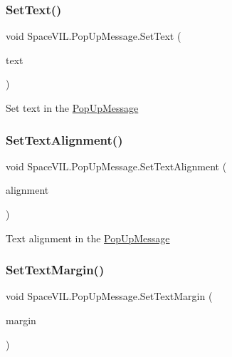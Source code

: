 \subsubsection{\texorpdfstring{Set\+Text()}{SetText()}}
{\footnotesize\ttfamily void Space\+V\+I\+L.\+Pop\+Up\+Message.\+Set\+Text (\begin{DoxyParamCaption}\item[{String}]{text }\end{DoxyParamCaption})}



Set text in the \mbox{\hyperlink{class_space_v_i_l_1_1_pop_up_message}{Pop\+Up\+Message}} 

\mbox{\label{class_space_v_i_l_1_1_pop_up_message_af4bf4824354cfdbe240c1fc613bc796e}} 
\subsubsection{\texorpdfstring{Set\+Text\+Alignment()}{SetTextAlignment()}}
{\footnotesize\ttfamily void Space\+V\+I\+L.\+Pop\+Up\+Message.\+Set\+Text\+Alignment (\begin{DoxyParamCaption}\item[{Item\+Alignment}]{alignment }\end{DoxyParamCaption})}



Text alignment in the \mbox{\hyperlink{class_space_v_i_l_1_1_pop_up_message}{Pop\+Up\+Message}} 

\mbox{\label{class_space_v_i_l_1_1_pop_up_message_a4e8ddaa2f3270f1b5799c672525b8a1d}} 
\subsubsection{\texorpdfstring{Set\+Text\+Margin()}{SetTextMargin()}}
{\footnotesize\ttfamily void Space\+V\+I\+L.\+Pop\+Up\+Message.\+Set\+Text\+Margin (\begin{DoxyParamCaption}\item[{\mbox{\hyperlink{struct_space_v_i_l_1_1_decorations_1_1_indents}{Indents}}}]{margin }\end{DoxyParamCaption})}



